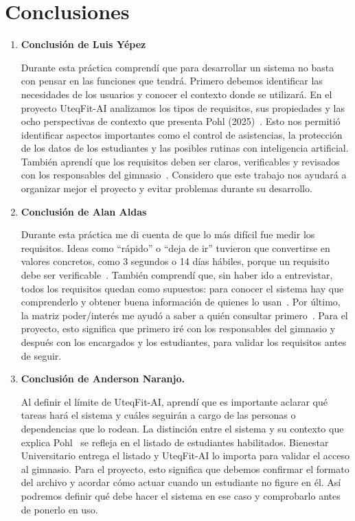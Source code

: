

\section*{Conclusiones}

\begin{enumerate}

\item \textbf{Conclusión de Luis Yépez}

Durante esta práctica comprendí que para desarrollar un sistema no basta con pensar en las funciones que tendrá. Primero debemos identificar las necesidades de los usuarios y conocer el contexto donde se utilizará. En el proyecto UteqFit-AI analizamos los tipos de requisitos, sus propiedades y las ocho perspectivas de contexto que presenta Pohl (2025)~\cite{pohl2025}. Esto nos permitió identificar aspectos importantes como el control de asistencias, la protección de los datos de los estudiantes y las posibles rutinas con inteligencia artificial. También aprendí que los requisitos deben ser claros, verificables y revisados con los responsables del gimnasio~\cite{ieee29148}. Considero que este trabajo nos ayudará a organizar mejor el proyecto y evitar problemas durante su desarrollo.

\item \textbf{Conclusión de Alan Aldas}

Durante esta práctica me di cuenta de que lo más difícil fue medir los requisitos. Ideas como ``rápido'' o ``deja de ir'' tuvieron que convertirse en valores concretos, como 3 segundos o 14 días hábiles, porque un requisito debe ser verificable~\cite{ieee29148}. También comprendí que, sin haber ido a entrevistar, todos los requisitos quedan como supuestos: para conocer el sistema hay que comprenderlo y obtener buena información de quienes lo usan~\cite{pohl2025}. Por último, la matriz poder/interés me ayudó a saber a quién consultar primero~\cite{pmbok7}. Para el proyecto, esto significa que primero iré con los responsables del gimnasio y después con los encargados y los estudiantes, para validar los requisitos antes de seguir.

\item \textbf{Conclusión de Anderson Naranjo.}

Al definir el límite de UteqFit-AI, aprendí que es importante aclarar qué tareas hará el sistema y cuáles seguirán a cargo de las personas o dependencias que lo rodean. La distinción entre el sistema y su contexto que explica Pohl~\cite{pohl2025} se refleja en el listado de estudiantes habilitados. Bienestar Universitario entrega el listado y UteqFit-AI lo importa para validar el acceso al gimnasio. Para el proyecto, esto significa que debemos confirmar el formato del archivo y acordar cómo actuar cuando un estudiante no figure en él. Así podremos definir qué debe hacer el sistema en ese caso y comprobarlo antes de ponerlo en uso.


\end{enumerate}
